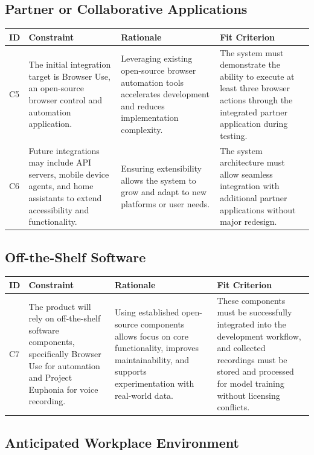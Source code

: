\documentclass[12pt]{article}
\begin{document}
\subsection{Partner or Collaborative Applications}


\begin{tabularx}{\textwidth}{p{1cm}X X X}
\toprule
\textbf{ID} & \textbf{Constraint} & \textbf{Rationale} & \textbf{Fit Criterion} \\
\midrule
C5 & The initial integration target is Browser Use, an open-source browser control and automation application. & Leveraging existing open-source browser automation tools accelerates development and reduces implementation complexity. & The system must demonstrate the ability to execute at least three browser actions through the integrated partner application during testing. \\
\hline
C6 & Future integrations may include API servers, mobile device agents, and home assistants to extend accessibility and functionality. & Ensuring extensibility allows the system to grow and adapt to new platforms or user needs. & The system architecture must allow seamless integration with additional partner applications without major redesign. \\
\bottomrule
\end{tabularx}

\subsection{Off-the-Shelf Software}

\begin{tabularx}{\textwidth}{p{1cm}X X X}
\toprule
\textbf{ID} & \textbf{Constraint} & \textbf{Rationale} & \textbf{Fit Criterion} \\
\midrule
C7 & The product will rely on off-the-shelf software components, specifically Browser Use for automation and Project Euphonia for voice recording. & Using established open-source components allows focus on core functionality, improves maintainability, and supports experimentation with real-world data. & These components must be successfully integrated into the development workflow, and collected recordings must be stored and processed for model training without licensing conflicts. \\
\bottomrule
\end{tabularx}

\subsection{Anticipated Workplace Environment}
\end{document}
